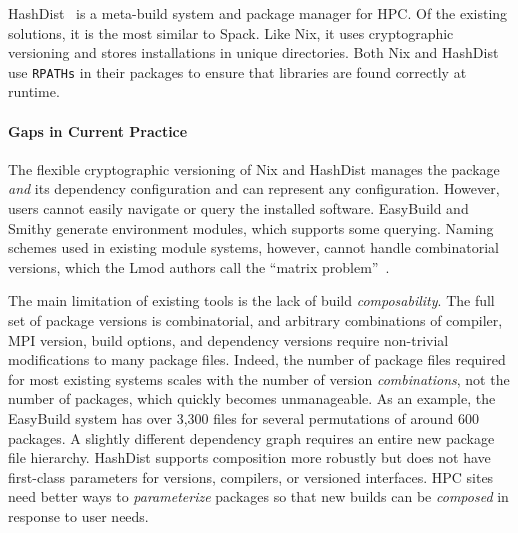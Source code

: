 HashDist~\cite{hashdist} is a meta-build system and package manager
for HPC.  Of the existing solutions, it is the most similar to Spack.
Like Nix, it uses cryptographic versioning and stores installations in
unique directories.
%
Both Nix and HashDist use {\tt RPATHs} in their packages to ensure that
libraries are found correctly at runtime.

\paragraph{Gaps in Current Practice}
The flexible cryptographic versioning of Nix and HashDist manages
the package {\it and} its dependency configuration and can represent any
configuration. However, users cannot easily navigate or query the installed
software.
%
EasyBuild and Smithy generate environment modules, which supports some
querying. Naming schemes used in existing module systems, however, cannot
handle combinatorial versions, which the Lmod authors call the
``matrix problem''~\cite{mclay:lmod-tutorial}.



The main limitation of existing tools is the lack of build {\it composability}.
The full set of package versions is combinatorial, and arbitrary combinations
of compiler, MPI version, build options, and dependency versions require
non-trivial modifications to many package files. Indeed, the number of package
files required for most existing systems scales with the number of version
{\it combinations}, not the number of packages, which quickly becomes
unmanageable.  As an example, the EasyBuild system has over 3,300 files for
several permutations of around 600 packages. A slightly different dependency
graph requires an entire new package file hierarchy.  HashDist supports
composition more robustly but does not have first-class parameters for
versions, compilers, or versioned interfaces.
%
HPC sites need better ways to {\it parameterize} packages so that new
builds can be {\it composed} in response to user needs.
%
